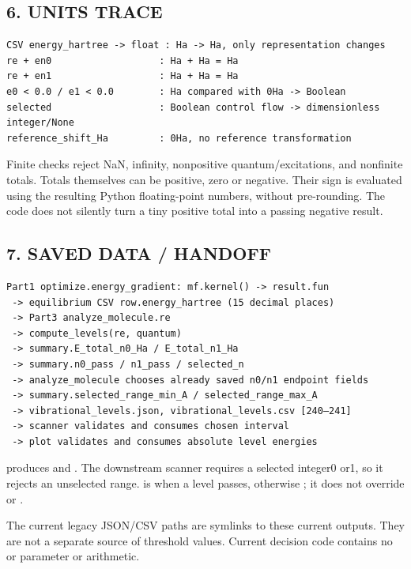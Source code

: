\documentclass[10pt,a4paper]{article}
\begin{document}
\subsection{6. UNITS TRACE}
\begin{Verbatim}
CSV energy_hartree -> float : Ha -> Ha, only representation changes
re + en0                   : Ha + Ha = Ha
re + en1                   : Ha + Ha = Ha
e0 < 0.0 / e1 < 0.0        : Ha compared with 0Ha -> Boolean
selected                   : Boolean control flow -> dimensionless integer/None
reference_shift_Ha         : 0Ha, no reference transformation
\end{Verbatim}
Finite checks reject NaN, infinity, nonpositive quantum/excitations, and nonfinite totals. Totals themselves can be positive, zero or negative. Their sign is evaluated using the resulting Python floating-point numbers, without pre-rounding. The code does not silently turn a tiny positive total into a passing negative result.

\subsection{7. SAVED DATA / HANDOFF}
\begin{Verbatim}
Part1 optimize.energy_gradient: mf.kernel() -> result.fun
 -> equilibrium CSV row.energy_hartree (15 decimal places)
 -> Part3 analyze_molecule.re
 -> compute_levels(re, quantum)
 -> summary.E_total_n0_Ha / E_total_n1_Ha
 -> summary.n0_pass / n1_pass / selected_n
 -> analyze_molecule chooses already saved n0/n1 endpoint fields
 -> summary.selected_range_min_A / selected_range_max_A
 -> vibrational_levels.json, vibrational_levels.csv [240–241]
 -> scanner validates and consumes chosen interval
 -> plot validates and consumes absolute level energies
\end{Verbatim}
 produces  and . The downstream scanner requires a selected integer0 or1, so it rejects an unselected range.  is  when a level passes, otherwise ; it does not override  or .

The current legacy JSON/CSV paths are symlinks to these current outputs. They are not a separate source of threshold values. Current decision code contains no  or  parameter or arithmetic.
\end{document}
